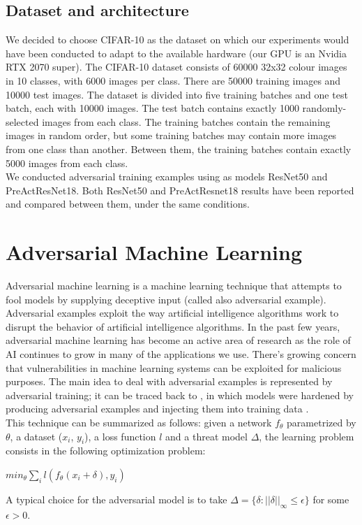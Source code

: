 \documentclass{article}
\begin{document}
\subsection{Dataset and architecture}

We decided to choose CIFAR-10 as the dataset on which our experiments would have been conducted to adapt to the available hardware (our GPU is an Nvidia RTX 2070 super). The CIFAR-10 dataset consists of 60000 32x32 colour images in 10 classes, with 6000 images per class. There are 50000 training images and 10000 test images. The dataset is divided into five training batches and one test batch, each with 10000 images. The test batch contains exactly 1000 randomly-selected images from each class. The training batches contain the remaining images in random order, but some training batches may contain more images from one class than another. Between them, the training batches contain exactly 5000 images from each class.\\
We conducted adversarial training examples using as models ResNet50 and PreActResNet18. 
Both ResNet50 and PreActResnet18 results have been reported and compared between them, under the same conditions. 


\section{Adversarial Machine Learning}
Adversarial machine learning is a machine learning technique that attempts to fool models by supplying deceptive input (called also adversarial example). Adversarial examples exploit the way artificial intelligence algorithms work to disrupt the behavior of artificial intelligence algorithms. In the past few years, adversarial machine learning has become an active area of research as the role of AI continues to grow in many of the applications we use. There’s growing concern that vulnerabilities in machine learning systems can be exploited for malicious purposes. The main idea to deal with adversarial examples is represented by adversarial training; it can be traced back to \cite{GoodfellowEtAl2015}, in which models were hardened by producing adversarial examples and injecting them into training data \cite{ShafahiEtAl2019b}.\\
This technique can be summarized as follows: given a network $f_{\theta}$ parametrized by $\theta$, a dataset ($x_i$, $y_i$), a loss function $l$ and a threat model $\Delta$, the learning problem consists in the following optimization problem:
\begin{center}
	$min_{\theta}{\sum_{i}l(f_{\theta}(x_i + \delta), y_i)}$
\end{center}
A typical choice for the adversarial model is to take $\Delta = \{\delta : ||\delta||_{\infty} \le \epsilon\}$ for some $\epsilon > 0$.
\end{document}
